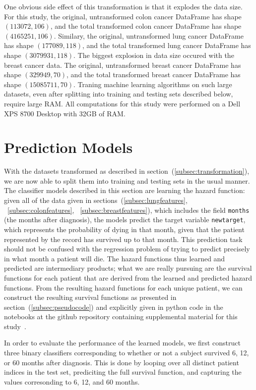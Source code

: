 \documentclass[a4paper,11pt]{article}
\newcommand{\codewhite}[1]{\colorbox{white}{\texttt{#1}}}
\begin{document}
One obvious side effect of this transformation is that it explodes the data size.
For this study, the original, untransformed colon cancer DataFrame has shape $(113072, 106)$, and the total transformed colon cancer DataFrame has shape $(4165251, 106)$.
Similary, the original, untransformed lung cancer DataFrame has shape $(177089, 118)$, and the total transformed lung cancer DataFrame has shape $(3079931, 118)$.
The biggest explosion in data size occured with the breast cancer data. 
The original, untransformed breast cancer DataFrame has shape $(329949, 70)$, and the total transformed breast cancer DataFrame has shape $(15085711, 70)$.
Traning machine learning algorithms on such large datasets, even after splitting into training and testing sets described below, require large RAM. All computations for this study were performed on a Dell XPS 8700 Desktop with 32GB of RAM.


\section{Prediction Models}
\label{sec:predmodels}

With the datasets transformed as described in section~(\ref{subsec:transformation}), we are now able to split them into training and testing sets in the usual manner.
The classifier models described in this section are learning the hazard function: given all of the data given in sections~(\ref{subsec:lungfeatures}, ~\ref{subsec:colonfeatures}, ~\ref{subsec:breastfeatures}), which includes the field \codewhite{months} (the months after diagnosis), the models predict the target variable \codewhite{newtarget}, which represents the probability of dying in that month, given that the patient represented by the record has survived up to that month. This prediction task should not be confused with the regression problem of trying to predict precisely in what month a patient will die.
The hazard functions thus learned and predicted are intermediary products; what we are really pursuing are the survival functions for each patient that are derived from the learned and predicted hazard functions.
From the resulting hazard functions for each unique patient, we can construct the
resulting survival functions as presented in section~(\ref{subsec:pseudocode}) and explicitly given in python code in the notebooks at the github repository containing supplemental material for this study~\cite{supp}.

In order to evaluate the performance of the learned models, we first construct three binary classifiers corresponding to whether or not a subject survived 6, 12, or 60 months after diagnosis. 
This is done by looping over all distinct patient indices in the test set, prediciting the full survival function, and capturing the values corresonding to 6, 12, and 60 months.  
\end{document}
